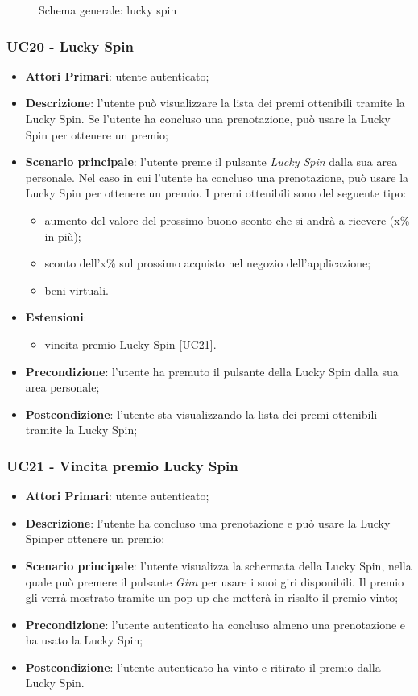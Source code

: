 \begin{figure}[h]
	\centering
	\caption{Schema generale: lucky spin}
\end{figure}
\subsubsection{UC20 - Lucky Spin}
\begin{itemize}
	\item \textbf{Attori Primari}: utente autenticato;
	\item \textbf{Descrizione}:	l'utente può visualizzare la lista dei premi ottenibili tramite la Lucky Spin\glo. Se l'utente ha concluso una prenotazione, può usare la Lucky Spin per ottenere un premio;
	\item \textbf{Scenario principale}: l'utente preme il pulsante \textit{Lucky Spin} dalla sua area personale. Nel caso in cui l'utente ha concluso una prenotazione, può usare la Lucky Spin per ottenere un premio. I premi ottenibili sono del seguente tipo:
	\begin{itemize}
		\item aumento del valore del prossimo buono sconto che si andrà a ricevere (x\% in più);
		\item sconto dell'x\% sul prossimo acquisto nel negozio dell'applicazione;
		\item beni virtuali.
	\end{itemize}
	\item \textbf{Estensioni}: 
	\begin{itemize}
		\item vincita premio Lucky Spin [UC21].
	\end{itemize}
	\item \textbf{Precondizione}: l'utente ha premuto il pulsante della Lucky Spin dalla sua area personale;
	\item \textbf{Postcondizione}: l'utente sta visualizzando la lista dei premi ottenibili tramite la Lucky Spin;
\end{itemize}
\subsubsection{UC21 - Vincita premio Lucky Spin}
\begin{itemize}
	\item \textbf{Attori Primari}: utente autenticato;
	\item \textbf{Descrizione}: l'utente ha concluso una prenotazione e può usare la Lucky Spin\glosp per ottenere un premio;	
	\item \textbf{Scenario principale}: l'utente visualizza la schermata della Lucky Spin, nella quale può premere il pulsante \textit{Gira} per usare i suoi giri disponibili. Il premio gli verrà mostrato tramite un pop-up che metterà in risalto il premio vinto;
	\item \textbf{Precondizione}: l'utente autenticato ha concluso almeno una prenotazione e ha usato la Lucky Spin;
	\item \textbf{Postcondizione}: l'utente autenticato ha vinto e ritirato il premio dalla Lucky Spin.
\end{itemize}
